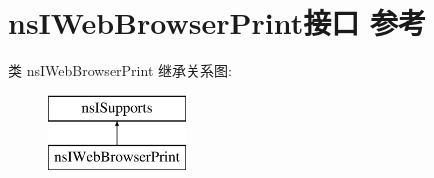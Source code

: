 \hypertarget{interfacens_i_web_browser_print}{}\section{ns\+I\+Web\+Browser\+Print接口 参考}
\label{interfacens_i_web_browser_print}
类 ns\+I\+Web\+Browser\+Print 继承关系图\+:\begin{figure}[H]
\begin{center}
\leavevmode
\includegraphics[height=2.000000cm]{interfacens_i_web_browser_print}
\end{center}
\end{figure}
